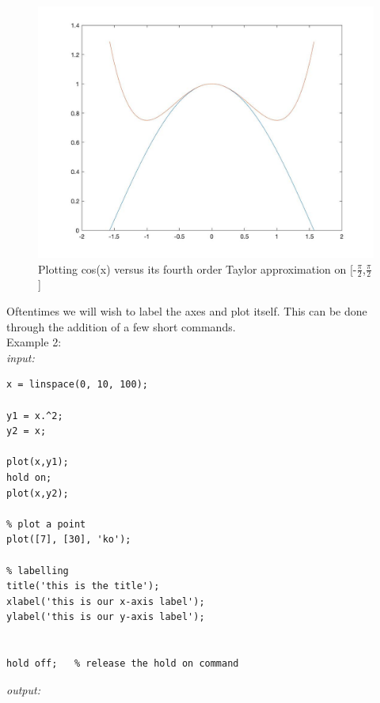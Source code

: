 \documentclass[../MATLAB_Primer.tex]{subfiles}
\begin{document}
\begin{figure}[H]
    \centering
    \includegraphics[width=350pt]{images/plotting_example1.jpg}
    \caption{Plotting cos(x) versus its fourth order Taylor approximation on [-$\frac{\pi}{2}$,$\frac{\pi}{2}$]}
    \label{fig:plotting_example1}
\end{figure}

Oftentimes we will wish to label the axes and plot itself.  This can be done through the addition of a few short commands.\\ 

Example 2:\\

\textit{input:}
\begin{lstlisting}
x = linspace(0, 10, 100);

y1 = x.^2;
y2 = x;

plot(x,y1);
hold on; 
plot(x,y2);

% plot a point 
plot([7], [30], 'ko');

% labelling
title('this is the title');
xlabel('this is our x-axis label');
ylabel('this is our y-axis label');


hold off;   % release the hold on command

\end{lstlisting}
\textit{output:}
\end{document}
